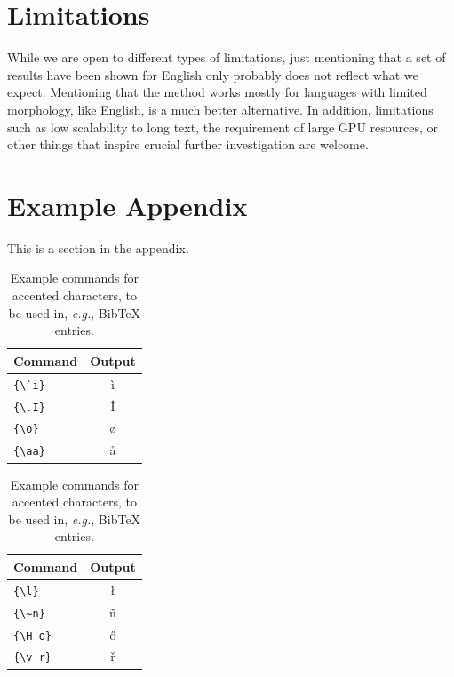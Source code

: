 \documentclass[11pt]{article}
\begin{document}
\section*{Limitations}
While we are open to different types of limitations, just mentioning that a set of results have been shown for English only probably does not reflect what we expect. 
Mentioning that the method works mostly for languages with limited morphology, like English, is a much better alternative.
In addition, limitations such as low scalability to long text, the requirement of large GPU resources, or other things that inspire crucial further investigation are welcome.




\appendix

\section{Example Appendix}
\label{sec:appendix}

This is a section in the appendix.
\begin{table}
	\centering
	\begin{tabular}{lc}
		\hline
		\textbf{Command} & \textbf{Output}\\
		\hline
		\verb|{\`i}| & {\`i} \\ 
		\verb|{\.I}| & {\.I} \\ 
		\verb|{\o}| & {\o} \\
		\verb|{\aa}| & {\aa}  \\\hline
	\end{tabular}
	\begin{tabular}{lc}
		\hline
		\textbf{Command} & \textbf{Output}\\
		\hline 
		\verb|{\l}| & {\l} \\ 
		\verb|{\~n}| & {\~n} \\ 
		\verb|{\H o}| & {\H o} \\ 
		\verb|{\v r}| & {\v r} \\ 
		\hline
	\end{tabular}
	\caption{Example commands for accented characters, to be used in, \emph{e.g.}, Bib\TeX{} entries.}
	\label{tab:accents}
\end{table}
\end{document}
